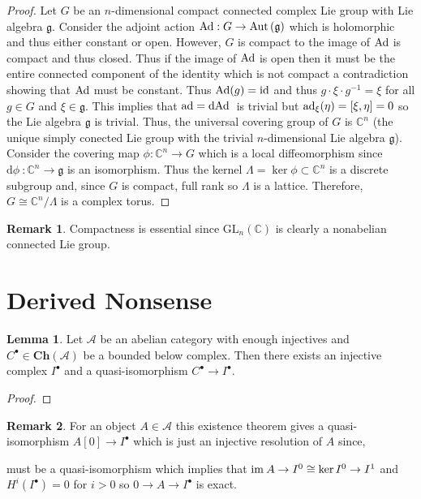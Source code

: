 \documentclass[12pt]{extarticle}
\newcommand{\id}{\mathrm{id}}
\renewcommand{\d}[1]{ \mathrm{d}#1 \:}
\theoremstyle{definition}
\newtheorem{lemma}[theorem]{Lemma}
\newtheorem{remark}{Remark}
\newcommand{\g}{\mathfrak{g}}
\newcommand{\Aut}[1]{\mathrm{Aut}\left(#1 \right)}
\newcommand{\C}{\mathbb{C}}
\begin{document}
\begin{proof}
Let $G$ be an $n$-dimensional compact connected complex Lie group with Lie algebra $\g$. Consider the adjoint action $\Ad : G \to \Aut{\g}$ which is holomorphic and thus either constant or open. However, $G$ is compact to the image of $\mathrm{Ad}$ is compact and thus closed. Thus if the image of $\mathrm{Ad}$ is open then it must be the entire connected component of the identity which is not compact a contradiction showing that $\mathrm{Ad}$ must be constant. Thus $\Ad{(g)} = \id$ and thus $g \cdot \xi \cdot g^{-1} = \xi$ for all $g \in G$ and $\xi \in \g$. This implies that $\ad = \d{\Ad}$ is trivial but $\mathrm{ad}_{\xi}(\eta) = [\xi, \eta] = 0$ so the Lie algebra $\g$ is trivial. Thus, the universal covering group of $G$ is $\C^n$ (the unique simply conected Lie group with the trivial $n$-dimensional Lie algebra $\g$). Consider the covering map $\phi : \C^n \to G$ which is a local diffeomorphism since $\d{\phi} : \C^n \to \g$ is an isomorphism. Thus the kernel $\Lambda = \ker{\phi} \subset \C^n$ is a discrete subgroup and, since $G$ is compact, full rank so $\Lambda$ is a lattice. Therefore, $G \cong \C^n / \Lambda$ is a complex torus.
\end{proof}

\begin{remark}
Compactness is essential since $\mathrm{GL}_{n}(\C)$ is clearly a nonabelian  connected Lie group. 
\end{remark}


\section{Derived Nonsense}

\newcommand{\Ch}[1]{\mathbf{Ch}\left( #1 \right)}
\renewcommand{\A}{\mathcal{A}}

\begin{lemma}
Let $\A$ be an abelian category with enough injectives and $C^\bullet \in \Ch{\A}$ be a bounded below complex. Then there exists an injective complex $I^\bullet$ and a quasi-isomorphism $C^\bullet \to I^\bullet$. 
\end{lemma}

\begin{proof}

\end{proof}

\begin{remark}
For an object $A \in \A$ this existence theorem gives a quasi-isomorphism $A[0] \to I^\bullet$ which is just an injective resolution of $A$ since,
\begin{center}
\end{center}
must be a quasi-isomorphism which implies that $\mathrm{im} \:{A \to I^0} \cong \ker{I^0 \to I^1}$ and $H^i(I^\bullet) = 0$ for $i > 0$ so $0 \to A \to I^\bullet$ is exact.
\end{remark}
\end{document}
